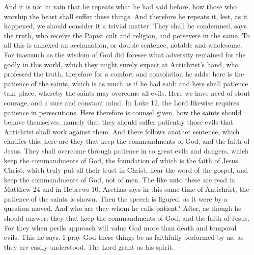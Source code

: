 And it is not in vain that he repeats what he had said before, how those who worship the beast shall suffer these things. And therefore he repeats it, lest, as it happened, we should consider it a trivial matter. They shall be condemned, says the truth, who receive the Papist cult and religion, and persevere in the same. To all this is annexed an acclamation, or double sentence, notable and wholesome. For inasmuch as the wisdom of God did foresee what adversity remained for the godly in this world, which they might surely expect at Antichrist’s hand, who professed the truth, therefore for a comfort and consolation he adds: here is the patience of the saints, which is as much as if he had said: and here shall patience take place, whereby the saints may overcome all evils. Here we have need of stout courage, and a sure and constant mind. In Luke 12, the Lord likewise requires patience in persecutions. Here therefore is counsel given, how the saints should behave themselves, namely that they should suffer patiently those evils that Antichrist shall work against them. And there follows another sentence, which clarifies this: here are they that keep the commandments of God, and the faith of Jesus. They shall overcome through patience in so great evils and dangers, which keep the commandments of God, the foundation of which is the faith of Jesus Christ; which truly put all their trust in Christ, hear the word of the gospel, and keep the commandments of God, not of men. The like unto these are read in Matthew 24 and in Hebrews 10. Arethas says in this same time of Antichrist, the patience of the saints is shown. Then the speech is figured, as it were by a question moved. And who are they whom he calls patient? After, as though he should answer: they that keep the commandments of God, and the faith of Jesus. For they when perils approach will value God more than death and temporal evils. This he says. I pray God these things be as faithfully performed by us, as they are easily understood. The Lord grant us his spirit.
